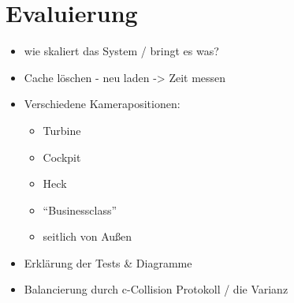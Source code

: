 \chapter{Evaluierung}
%
\begin{itemize}
 \item wie skaliert das System / bringt es was?
 \item Cache löschen - neu laden -> Zeit messen
 \item Verschiedene Kamerapositionen:
 \begin{itemize}
  \item Turbine
  \item Cockpit
  \item Heck
  \item ``Businessclass''
  \item seitlich von Außen
 \end{itemize}
 \item Erklärung der Tests \& Diagramme
 \item Balancierung durch c-Collision Protokoll / die Varianz
\end{itemize}



